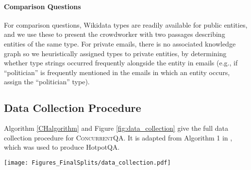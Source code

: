 \documentclass{article}
\newcommand{\datasetname}{\textsc{ConcurrentQA}\xspace}
\begin{document}
\paragraph{Comparison Questions} For comparison questions, Wikidata types are readily available for public entities, and we use these to present the crowdworker with two passages describing entities of the same type. For private emails, there is no associated knowledge graph so we heuristically assigned types to private entities, by determining whether type strings occurred frequently alongside the entity in emails (e.g., if ``politician'' is frequently mentioned in the emails in which an entity occurs, assign the ``politician'' type).


\subsection{Data Collection Procedure}
Algorithm \ref{CHalgorithm} and Figure \ref{fig:data_collection} give the full data collection procedure for \datasetname. It is adapted from Algorithm 1 in \citet{yang2018hotpotqa}, which was used to produce HotpotQA. 

\begin{figure*}[t!]
    \centering
    \texttt{[image: Figures\_FinalSplits/data\_collection.pdf]}
    \caption[width=\linewidth]{The end-to-end data collection pipeline includes (1) passage-pair generation: we identified entities appearing in emails and Wikipedia passages and categorized entities as public or private, (2) question generation: workers are asked to write a question-answer pair given two passages and a hint stating the common entities in the passages, (3) validation: workers answer a series of questions about each generated question-answer pair to filter out low-quality questions. During the entire process, we manually review questions and workers' understanding of the task.}
    \label{fig:data_collection}
\end{figure*}
\end{document}

